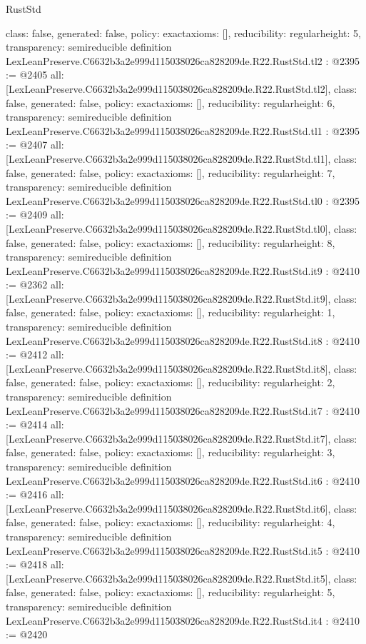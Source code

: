 \begin{lexlean}{RustStd}
\begin{coremodule}
{  class: false,
  generated: false,
  policy: exact{axioms: []},
  reducibility: regular{height: 5},
  transparency: semireducible
}
definition LexLeanPreserve.C6632b3a2e999d115038026ca828209de.R22.RustStd.tl2 : @2395 := @2405 {
  all: [LexLeanPreserve.C6632b3a2e999d115038026ca828209de.R22.RustStd.tl2],
  class: false,
  generated: false,
  policy: exact{axioms: []},
  reducibility: regular{height: 6},
  transparency: semireducible
}
definition LexLeanPreserve.C6632b3a2e999d115038026ca828209de.R22.RustStd.tl1 : @2395 := @2407 {
  all: [LexLeanPreserve.C6632b3a2e999d115038026ca828209de.R22.RustStd.tl1],
  class: false,
  generated: false,
  policy: exact{axioms: []},
  reducibility: regular{height: 7},
  transparency: semireducible
}
definition LexLeanPreserve.C6632b3a2e999d115038026ca828209de.R22.RustStd.tl0 : @2395 := @2409 {
  all: [LexLeanPreserve.C6632b3a2e999d115038026ca828209de.R22.RustStd.tl0],
  class: false,
  generated: false,
  policy: exact{axioms: []},
  reducibility: regular{height: 8},
  transparency: semireducible
}
definition LexLeanPreserve.C6632b3a2e999d115038026ca828209de.R22.RustStd.it9 : @2410 := @2362 {
  all: [LexLeanPreserve.C6632b3a2e999d115038026ca828209de.R22.RustStd.it9],
  class: false,
  generated: false,
  policy: exact{axioms: []},
  reducibility: regular{height: 1},
  transparency: semireducible
}
definition LexLeanPreserve.C6632b3a2e999d115038026ca828209de.R22.RustStd.it8 : @2410 := @2412 {
  all: [LexLeanPreserve.C6632b3a2e999d115038026ca828209de.R22.RustStd.it8],
  class: false,
  generated: false,
  policy: exact{axioms: []},
  reducibility: regular{height: 2},
  transparency: semireducible
}
definition LexLeanPreserve.C6632b3a2e999d115038026ca828209de.R22.RustStd.it7 : @2410 := @2414 {
  all: [LexLeanPreserve.C6632b3a2e999d115038026ca828209de.R22.RustStd.it7],
  class: false,
  generated: false,
  policy: exact{axioms: []},
  reducibility: regular{height: 3},
  transparency: semireducible
}
definition LexLeanPreserve.C6632b3a2e999d115038026ca828209de.R22.RustStd.it6 : @2410 := @2416 {
  all: [LexLeanPreserve.C6632b3a2e999d115038026ca828209de.R22.RustStd.it6],
  class: false,
  generated: false,
  policy: exact{axioms: []},
  reducibility: regular{height: 4},
  transparency: semireducible
}
definition LexLeanPreserve.C6632b3a2e999d115038026ca828209de.R22.RustStd.it5 : @2410 := @2418 {
  all: [LexLeanPreserve.C6632b3a2e999d115038026ca828209de.R22.RustStd.it5],
  class: false,
  generated: false,
  policy: exact{axioms: []},
  reducibility: regular{height: 5},
  transparency: semireducible
}
definition LexLeanPreserve.C6632b3a2e999d115038026ca828209de.R22.RustStd.it4 : @2410 := @2420 {
}
\end{coremodule}
\end{lexlean}
